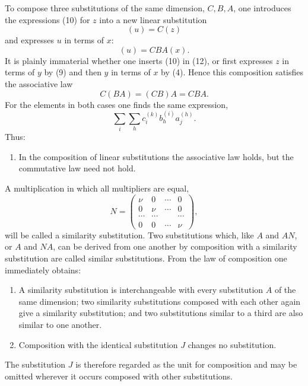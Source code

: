 \documentclass[11pt]{article}
\begin{document}
To compose three substitutions of the same dimension, $C,B,A$, one introduces the expressions (10) for $z$ into a new linear substitution
\begin{equation}
(u)=C(z)
\tag{12}
\end{equation}
and expresses $u$ in terms of $x$:
\begin{equation}
(u)=CBA(x).
\tag{13}
\end{equation}
It is plainly immaterial whether one inserts (10) in (12), or first expresses $z$ in terms of $y$ by (9) and then $y$ in terms of $x$ by (4). Hence this composition satisfies the associative law
\begin{equation}
C(BA)=(CB)A=CBA.
\tag{14}
\end{equation}
For the elements in both cases one finds the same expression,
\[
\sum_i\sum_h c_i^{(k)}b_h^{(i)}a_j^{(h)}.
\]
Thus:
\begin{enumerate}[label=\arabic*.,leftmargin=2.2em,start=3]
\item In the composition of linear substitutions the associative law holds, but the commutative law need not hold.
\end{enumerate}

A multiplication in which all multipliers are equal,
\[
N=\begin{pmatrix}
\nu&0&\cdots&0\\
0&\nu&\cdots&0\\
\cdots&\cdots&&\cdots\\
0&0&\cdots&\nu
\end{pmatrix},
\]
will be called a similarity substitution. Two substitutions which, like $A$ and $AN$, or $A$ and $NA$, can be derived from one another by composition with a similarity substitution are called similar substitutions. From the law of composition one immediately obtains:
\begin{enumerate}[label=\arabic*.,leftmargin=2.2em,start=4]
\item A similarity substitution is interchangeable with every substitution $A$ of the same dimension; two similarity substitutions composed with each other again give a similarity substitution; and two substitutions similar to a third are also similar to one another.
\item Composition with the identical substitution $J$ changes no substitution.
\end{enumerate}
The substitution $J$ is therefore regarded as the unit for composition and may be omitted wherever it occurs composed with other substitutions.
\end{document}
